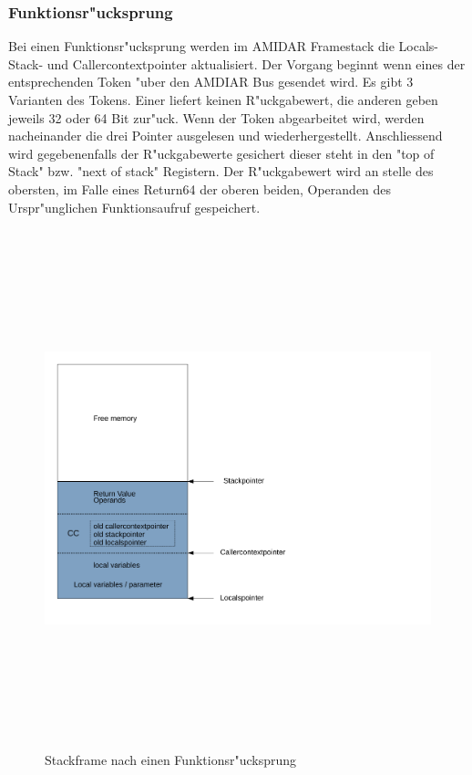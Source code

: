 \subsubsection{Funktionsr"ucksprung}

Bei einen Funktionsr"ucksprung werden im AMIDAR Framestack die Locals- Stack- und Callercontextpointer aktualisiert. Der Vorgang beginnt wenn eines der entsprechenden Token "uber den AMDIAR Bus gesendet wird. Es gibt 3 Varianten des Tokens. Einer liefert keinen R"uckgabewert, die anderen geben jeweils 32 oder 64 Bit zur"uck. Wenn der Token abgearbeitet wird, werden nacheinander die drei Pointer ausgelesen und wiederhergestellt. Anschlie{ss}end wird gegebenenfalls der R"uckgabewerte gesichert dieser steht in den "top of Stack" bzw. "next of stack" Registern. Der R"uckgabewert wird an stelle des obersten, im Falle eines Return64 der oberen beiden, Operanden des Urspr"unglichen Funktionsaufruf gespeichert. 

\begin{figure}
	\centering
	\includegraphics[height = 15cm]{PS_RS_graphics/Stackframe after return.pdf}
	\caption{Stackframe nach einen Funktionsr"ucksprung}
\end{figure}